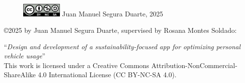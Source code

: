 \vspace*{\fill}

\begin{figure}[H]
    \includegraphics[width=2cm]{images/by-nc-sa.png} Juan Manuel Segura Duarte, 2025
\end{figure}

\copyright 2025 by Juan Manuel Segura Duarte, supervised by Rosana Montes Soldado:

``\textit{Design and development of a sustainability-focused app for optimizing personal vehicle usage}'' \\

This work is licensed under a Creative Commons Attribution-NonCommercial-ShareAlike 4.0 International License (CC BY-NC-SA 4.0).

